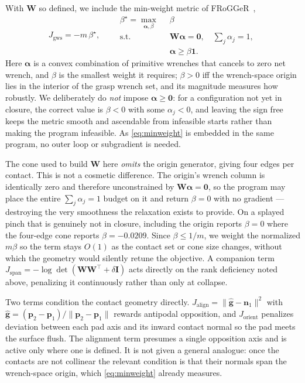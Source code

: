 With $\bm{W}$ so defined, we include the min-weight metric of
FRoGGeR~\cite{li2023frogger},
%
\begin{equation}
  J_{\mathrm{gws}} = -m\,\beta^\star, \qquad
  \begin{aligned}
    \beta^\star = \max_{\bm{\alpha}, \beta} \;\; & \beta \\
    \text{s.t.}\;\; & \bm{W}\bm{\alpha} = \bm{0}, \quad
                      \textstyle\sum_j \alpha_j = 1, \\
                    & \bm{\alpha} \ge \beta \bm{1}.
  \end{aligned}
  \label{eq:minweight}
\end{equation}
%
Here $\bm{\alpha}$ is a convex combination of primitive wrenches that cancels to
zero net wrench, and $\beta$ is the smallest weight it requires; $\beta > 0$ iff
the wrench-space origin lies in the interior of the grasp wrench set, and its
magnitude measures how robustly. We deliberately do \emph{not} impose
$\bm{\alpha} \ge \bm{0}$: for a configuration not yet in closure, the correct
value is $\beta < 0$ with some $\alpha_j < 0$, and leaving the sign free keeps
the metric smooth and ascendable from infeasible starts rather than making the
program infeasible. As \eqref{eq:minweight} is embedded in the same program, no
outer loop or subgradient is needed.

The cone used to build $\bm{W}$ here \emph{omits} the origin generator, giving four
edges per contact. This is not a cosmetic difference. The origin's wrench column is
identically zero and therefore unconstrained by $\bm{W}\bm{\alpha} = \bm{0}$, so the
program may place the entire $\sum_j \alpha_j = 1$ budget on it and return
$\beta = 0$ with no gradient --- destroying the very smoothness the relaxation exists
to provide. On a splayed pinch that is genuinely not in closure, including the origin
reports $\beta = 0$ where the four-edge cone reports $\beta = -0.0209$. Since
$\beta \le 1/m$, we weight the normalized $m\beta$ so the term stays $O(1)$ as the
contact set or cone size changes, without which the geometry would silently retune the
objective. A companion term
$J_{\mathrm{span}} = -\log\det(\bm{W}\bm{W}^{\top} + \delta \bm{I})$ acts directly on
the rank deficiency noted above, penalizing it continuously rather than only at
collapse.

Two terms condition the contact geometry directly.
$J_{\mathrm{align}} = \lVert \hat{\bm{g}} - \bm{n}_1 \rVert^2$ with
$\hat{\bm{g}} = (\bm{p}_2 - \bm{p}_1)/\lVert \bm{p}_2 - \bm{p}_1 \rVert$ rewards
antipodal opposition, and $J_{\mathrm{orient}}$ penalizes deviation between each
pad axis and its inward contact normal so the pad meets the surface flush. The
alignment term presumes a single opposition axis and is active only where one is
defined. It is not given a general analogue: once the contacts are not collinear the
relevant condition is that their normals span the wrench-space origin, which
\eqref{eq:minweight} already measures.

